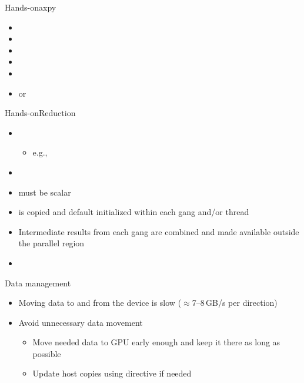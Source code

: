 \documentclass[12pt,aspectratio=169]{beamer}
\begin{document}
\begin{frame}[fragile]{Hands-on}{axpy}
  \begin{itemize}
  \item {}
  \item {}
  \item {}
  \item {}
  \item {}
  \item {} or 
  \end{itemize}
\end{frame}

\begin{frame}{Hands-on}{Reduction}
  \begin{itemize}
  \item {}
    \begin{itemize}
    \item e.g., 
    \end{itemize}
  \item {}
  \item {} must be scalar
  \item {} is copied and default initialized within each gang
    and/or thread
  \item Intermediate results from each gang are combined and made available
    outside the parallel region
  \item {}
  \end{itemize}
\end{frame}

\begin{frame}{Data management}
  \begin{itemize}
  \item Moving data to and from the device is slow ($\approx$7--8\,GB/s per
    direction)
  \item Avoid unnecessary data movement
    \begin{itemize}
    \item Move needed data to GPU early enough and keep it there as long as
      possible
    \item Update host copies using  directive
      if needed
    \end{itemize}
  \end{itemize}
\end{frame}
\end{document}
